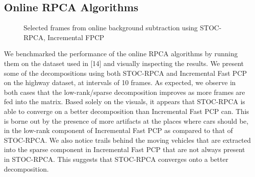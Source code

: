 \documentclass[oneside]{article}
\begin{document}
\subsection{Online RPCA Algorithms}
\begin{figure}[ht]
\centering
{}
\caption[]{Selected frames from online background subtraction using STOC-RPCA, Incremental FPCP}
\label{fig:subfigureExample2}
\end{figure}
We benchmarked the performance of the online RPCA algorithms by running them on the dataset used in [14] and visually inspecting the results. We present some of the decompositions using both STOC-RPCA and Incremental Fast PCP on the highway dataset, at intervals of 10 frames. As expected, we observe in both cases that the low-rank/sparse decomposition improves as more frames are fed into the matrix. Based solely on the visuals, it appears that STOC-RPCA is able to converge on a better decomposition than Incremental Fast PCP can. This is borne out by the presence of more artifacts at the places where cars should be, in the low-rank component of Incremental Fast PCP as compared to that of STOC-RPCA. We also notice trails behind the moving vehicles that are extracted into the sparse component in Incremental Fast PCP that are not always present in STOC-RPCA. This suggests that STOC-RPCA converges onto a better decomposition.\newline
\end{document}
